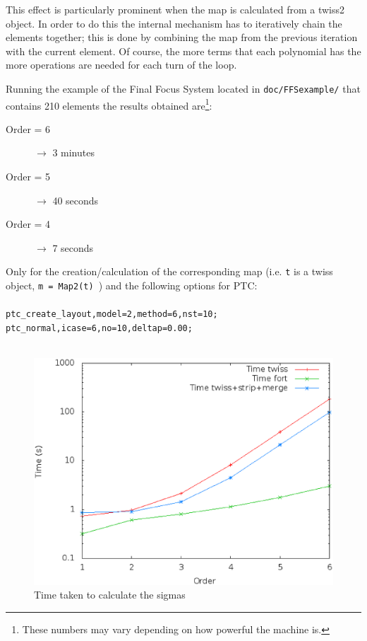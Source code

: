 \documentclass[a4paper]{cernatsnote}
\begin{document}
This effect is particularly prominent when the map is calculated from
a twiss2 object. In order to do this the internal mechanism has to
iteratively chain the elements together; this is done by combining the
map from the previous iteration with the current element. Of course,
the more terms that each polynomial has the more operations are needed
for each turn of the loop.

Running the example of the Final Focus System located in
\texttt{doc/FFSexample/} that contains 210 elements the results
obtained are\footnote{These numbers may vary depending on how powerful
  the machine is.}:
\begin{description}
  \item[Order = 6]{$\longrightarrow$ 3 minutes}
  \item[Order = 5]{$\longrightarrow$ 40 seconds}
  \item[Order = 4]{$\longrightarrow$ 7 seconds}
\end{description}

Only for the creation/calculation of the corresponding map (i.e.
\texttt{t} is a twiss object, \texttt{m~=~Map2(t)}~) and the following
options for PTC:
\\\\
\texttt{ptc\_create\_layout,model=2,method=6,nst=10;}
\\
\texttt{ptc\_normal,icase=6,no=10,deltap=0.00;}
\\\\
\begin{figure}[!htb]
  \centering
  \includegraphics[width=0.8\columnwidth]{imgs/time.eps}
  \caption{Time taken to calculate the sigmas}
  \label{time}
\end{figure}
\end{document}
